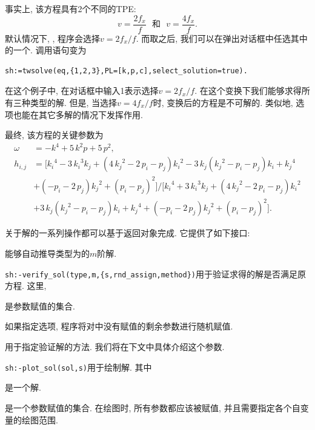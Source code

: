 事实上, 该方程具有2个不同的TPE:
\begin{equation}
v=\frac{2f_x}{f} \text{~~和~~} v=\frac{4f_x}{f}.
\end{equation}
默认情况下, , 程序会选择$v=2f_x/f$. 而取之后, 我们可以在弹出对话框中任选其中的一个. 调用语句变为
\begin{verbatim}
sh:=twsolve(eq,{1,2,3},PL=[k,p,c],select_solution=true).
\end{verbatim}
在这个例子中, 在对话框中输入1表示选择$v=2f_x/f$. 在这个变换下我们能够求得所有三种类型的解. 但是, 当选择$v=4f_x/f$时, 变换后的方程是不可解的. 类似地, 选项也能在其它多解的情况下发挥作用.

最终, 该方程的关键参数为
\begin{equation}
\begin{split}
\omega&=-{k}^{4}+5\,{k}^{2}p+5\,{p}^{2}, \\ 
h_{i,j}&=[{k_{{i}}}^{4}-3\,{k_{{i}}}^{3}k_{{j}}+ \left( 4\,{k_{{j}}}^{2}-2\,p_{{i}}-p_{{j}} \right) {k_{{i}}}^{2}-3\,k_{{j}} \left( {k_{{j}}}^{2}-p_{{i}}-p_{{j}} \right) k_{{i}}+{k_{{j}}}^{4}\\
&+\left( -p_{{i}}-2\,p_{{j}}\right) {k_{{j}}}^{2}+ \left( p_{{i}}-p_{{j}} \right) ^{2}]/[{k_{{i}}}^{4}+3\,{k_{{i}}}^{3}k_{{j}}+ \left( 4\,{k_{{j}}}^{2}-2\,p_{{i}}-p_{{j}} \right) {k_{{i}}}^{2}\\
&+3\,k_{{j}} \left( {k_{{j}}}^{2}-p_{{i}}-p_{{j}} \right) k_{{i}}+{k_{{j}}}^{4}+ \left( -p_{{i}}-2\,p_{{j}}\right) {k_{{j}}}^{2}+ \left( p_{{i}}-p_{{j}} \right) ^{2}].
\end{split}
\end{equation}

关于解的一系列操作都可以基于返回对象完成.  它提供了如下接口: 
\begin{compactitem}[\textbullet]
\item {}能够自动推导类型为的$m$阶解. 
\item \verb|sh:-verify_sol(type,m,{s,rnd_assign,method})|用于验证求得的解是否满足原方程. 这里,
\begin{compactitem}[- ]
\item {}是参数赋值的集合.
\item 如果指定选项, 程序将对中没有赋值的剩余参数进行随机赋值.
\item {}用于指定验证解的方法. 我们将在下文中具体介绍这个参数. 
\end{compactitem}
\item \verb|sh:-plot_sol(sol,s)|用于绘制解. 其中
\begin{compactitem}[- ]
\item {} 是一个解. 
\item {} 是一个参数赋值的集合. 在绘图时, 所有参数都应该被赋值, 并且需要指定各个自变量的绘图范围.
\end{compactitem}
\end{compactitem}

